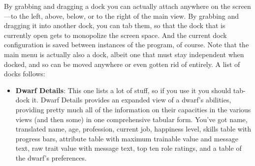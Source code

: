\documentclass[]{article}
\begin{document}
By grabbing and dragging a dock you can actually attach anywhere on the screen---to the left, above,
below, or to the right of the main view. By grabbing and dragging it into another dock, you can tab them,
so that the dock that is currently open gets to monopolize the screen space. And the current dock
configuration is saved between instances of the program, of course. Note that the main menu is actually
also a dock, albeit one that must stay independent when docked, and so can be moved anywhere or even
gotten rid of entirely. A list of docks follows:
\begin{itemize}
\item \textbf{Dwarf Details}: This one lists a lot of stuff, so if you use it you should tab-dock it.
Dwarf Details provides an expanded view of a dwarf's abilities, providing pretty much all of the
information on their capacities in the various views (and then some) in one comprehensive tabular form.
You've got name, translated name, age, profession, current job,  happiness level, skills table with
progress bars, attribute table with maximum trainable value and message text, raw trait value with
message text, top ten role ratings, and a table of the dwarf's preferences.


\end{itemize}
\end{document}

